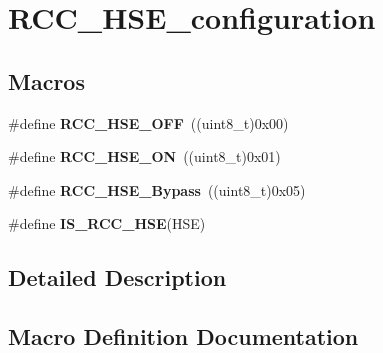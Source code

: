 \hypertarget{group___r_c_c___h_s_e__configuration}{}\section{R\+C\+C\+\_\+\+H\+S\+E\+\_\+configuration}
\label{group___r_c_c___h_s_e__configuration}
\subsection*{Macros}
\begin{DoxyCompactItemize}
\item 
\hypertarget{group___r_c_c___h_s_e__configuration_ga1616626d23fbce440398578855df6f97}{}\#define {\bfseries R\+C\+C\+\_\+\+H\+S\+E\+\_\+\+O\+F\+F}~((uint8\+\_\+t)0x00)\label{group___r_c_c___h_s_e__configuration_ga1616626d23fbce440398578855df6f97}

\item 
\hypertarget{group___r_c_c___h_s_e__configuration_gabc4f70a44776c557af20496b04d9a9db}{}\#define {\bfseries R\+C\+C\+\_\+\+H\+S\+E\+\_\+\+O\+N}~((uint8\+\_\+t)0x01)\label{group___r_c_c___h_s_e__configuration_gabc4f70a44776c557af20496b04d9a9db}

\item 
\hypertarget{group___r_c_c___h_s_e__configuration_ga09061e9909d5f588baa7bfb0f7edd9fa}{}\#define {\bfseries R\+C\+C\+\_\+\+H\+S\+E\+\_\+\+Bypass}~((uint8\+\_\+t)0x05)\label{group___r_c_c___h_s_e__configuration_ga09061e9909d5f588baa7bfb0f7edd9fa}

\item 
\#define {\bfseries I\+S\+\_\+\+R\+C\+C\+\_\+\+H\+S\+E}(H\+S\+E)
\end{DoxyCompactItemize}


\subsection{Detailed Description}


\subsection{Macro Definition Documentation}
\hypertarget{group___r_c_c___h_s_e__configuration_ga287bbcafd73d07ec915c2f793301908a}{}
